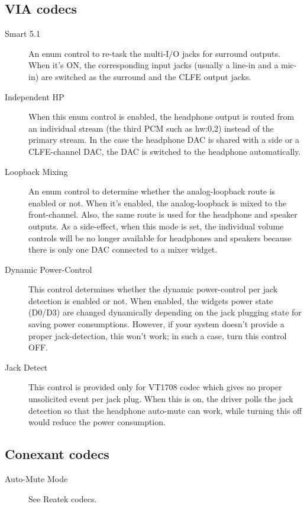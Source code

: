 \documentclass[a4paper,8pt,english]{sphinxmanual}
\begin{document}
\subsection{VIA codecs}
\label{sound/hd-audio/controls:via-codecs}\begin{description}
\item[{Smart 5.1}] \leavevmode
An enum control to re-task the multi-I/O jacks for surround outputs.
When it's ON, the corresponding input jacks (usually a line-in and a
mic-in) are switched as the surround and the CLFE output jacks.

\item[{Independent HP}] \leavevmode
When this enum control is enabled, the headphone output is routed
from an individual stream (the third PCM such as hw:0,2) instead of
the primary stream.  In the case the headphone DAC is shared with a
side or a CLFE-channel DAC, the DAC is switched to the headphone
automatically.

\item[{Loopback Mixing}] \leavevmode
An enum control to determine whether the analog-loopback route is
enabled or not.  When it's enabled, the analog-loopback is mixed to
the front-channel.  Also, the same route is used for the headphone
and speaker outputs.  As a side-effect, when this mode is set, the
individual volume controls will be no longer available for
headphones and speakers because there is only one DAC connected to a
mixer widget.

\item[{Dynamic Power-Control}] \leavevmode
This control determines whether the dynamic power-control per jack
detection is enabled or not.  When enabled, the widgets power state
(D0/D3) are changed dynamically depending on the jack plugging
state for saving power consumptions.  However, if your system
doesn't provide a proper jack-detection, this won't work; in such a
case, turn this control OFF.

\item[{Jack Detect}] \leavevmode
This control is provided only for VT1708 codec which gives no proper
unsolicited event per jack plug.  When this is on, the driver polls
the jack detection so that the headphone auto-mute can work, while
turning this off would reduce the power consumption.

\end{description}


\subsection{Conexant codecs}
\label{sound/hd-audio/controls:conexant-codecs}\begin{description}
\item[{Auto-Mute Mode}] \leavevmode
See Reatek codecs.

\end{description}
\end{document}
